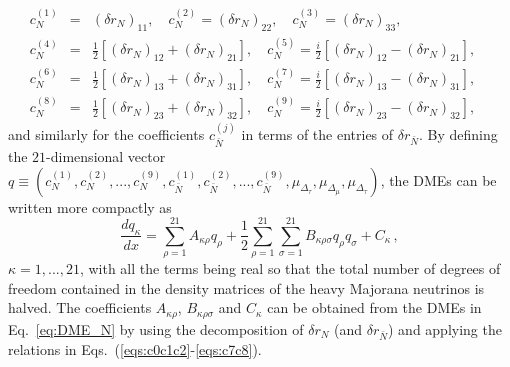 \documentclass[12pt, a4paper]{article}
\begin{document}
\begin{eqnarray}
c_N^{(1)} &=& 
(\delta r_N)_{11}, \quad c_N^{(2)} = (\delta r_N)_{22},\quad c_N^{(3)} = (\delta r_N)_{33},\label{eqs:c0c1c2}  \\
c_N^{(4)} &=& \frac{1}{2} \left[ (\delta r_N)_{12} + (\delta r_N)_{21} \right],\quad
c_N^{(5)} = \frac{i}{2} \left[ (\delta r_N)_{12} - (\delta r_N)_{21} \right], \quad \label{eqs:c3c4}\\
c_N^{(6)} &=& \frac{1}{2} \left[ (\delta r_N)_{13} + (\delta r_N)_{31} \right], \quad \label{eqs:c5c6}
c_N^{(7)} = \frac{i}{2} \left[ (\delta r_N)_{13} - (\delta r_N)_{31} \right], \\
c_N^{(8)} &=& \frac{1}{2} \left[ (\delta r_N)_{23} + (\delta r_N)_{32} \right], \quad \label{eqs:c7c8}
c_N^{(9)} = \frac{i}{2} \left[ (\delta r_N)_{23} - (\delta r_N)_{32} \right], 
\end{eqnarray}
and similarly for the coefficients $c_{\bar{N}}^{(j)}$ in terms of the entries of $\delta r_{\bar{N}}$.
By defining the $21$-dimensional vector $q \equiv (c_N^{(1)}, c_N^{(2)},...,c_N^{(9)}, c_{\bar{N}}^{(1)}, c_{\bar{N}}^{(2)}, ..., c_{\bar{N}}^{(9)}, \mu_{\Delta_\tau}, \mu_{\Delta_\mu}, \mu_{\Delta_\tau})$, the DMEs can be written more compactly as 
\begin{equation}\label{eq:DMEs_linear}
\frac{d q_\kappa}{dx} = \sum_{\rho=1}^{21} A_{\kappa \rho} q_\rho + \frac{1}{2} \sum_{\rho = 1}^{21}\sum_{\sigma=1}^{21}B_{\kappa \rho \sigma} q_\rho q_{\sigma} + C_\kappa\,,
\end{equation}
$\kappa = 1,...,21$, with all the terms being real so that the total number of degrees of freedom contained in the density matrices of the heavy Majorana neutrinos is halved. The coefficients $A_{\kappa \rho}$, $B_{\kappa \rho \sigma}$ and $C_\kappa$ can be obtained from the DMEs in Eq.~\eqref{eq:DME_N} by using the decomposition of $\delta r_N$ (and $\delta r_{\bar{N}}$) and applying the relations in Eqs.~(\ref{eqs:c0c1c2}-\ref{eqs:c7c8}). 
\end{document}
